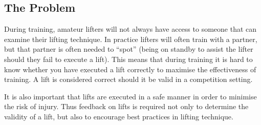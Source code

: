 \subsection{The Problem}

During training, amateur lifters will not always have access to someone that can examine their lifting technique. In practice lifters will often train with a partner, but that partner is often needed to ``spot'' (being on standby to assist the lifter should they fail to execute a lift). This means that during training it is hard to know whether you have executed a lift correctly to maximise the effectiveness of training. A lift is considered correct should it be valid in a competition setting.

It is also important that lifts are executed in a safe manner in order to minimise the risk of injury. Thus feedback on lifts is required not only to determine the validity of a lift, but also to encourage best practices in lifting technique.